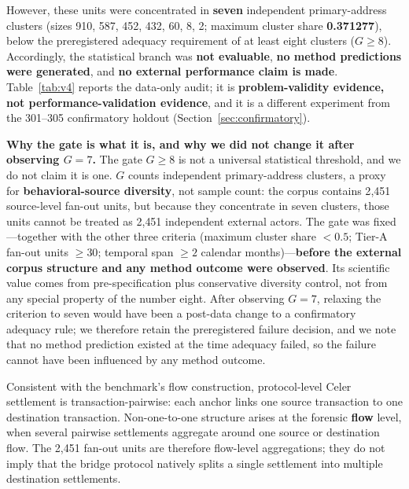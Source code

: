 However, these units were concentrated in \textbf{seven} independent primary-address clusters (sizes 910, 587, 452, 432, 60, 8, 2; maximum cluster share \textbf{0.371277}), below the preregistered adequacy requirement of at least eight clusters ($G \ge 8$). Accordingly, the statistical branch was \textbf{not evaluable}, \textbf{no method predictions were generated}, and \textbf{no external performance claim is made}. Table~\ref{tab:v4} reports the data-only audit; it is \textbf{problem-validity evidence, not performance-validation evidence}, and it is a different experiment from the 301--305 confirmatory holdout (Section~\ref{sec:confirmatory}).

\textbf{Why the gate is what it is, and why we did not change it after observing $G = 7$.} The gate $G \ge 8$ is not a universal statistical threshold, and we do not claim it is one. $G$ counts independent primary-address clusters, a proxy for \textbf{behavioral-source diversity}, not sample count: the corpus contains 2{,}451 source-level fan-out units, but because they concentrate in seven clusters, those units cannot be treated as 2{,}451 independent external actors. The gate was fixed---together with the other three criteria (maximum cluster share $< 0.5$; Tier-A fan-out units $\ge 30$; temporal span $\ge 2$ calendar months)---\textbf{before the external corpus structure and any method outcome were observed}. Its scientific value comes from pre-specification plus conservative diversity control, not from any special property of the number eight. After observing $G = 7$, relaxing the criterion to seven would have been a post-data change to a confirmatory adequacy rule; we therefore retain the preregistered failure decision, and we note that no method prediction existed at the time adequacy failed, so the failure cannot have been influenced by any method outcome.

Consistent with the benchmark's flow construction, protocol-level Celer settlement is transaction-pairwise: each anchor links one source transaction to one destination transaction. Non-one-to-one structure arises at the forensic \textbf{flow} level, when several pairwise settlements aggregate around one source or destination flow. The 2{,}451 fan-out units are therefore flow-level aggregations; they do not imply that the bridge protocol natively splits a single settlement into multiple destination settlements.

